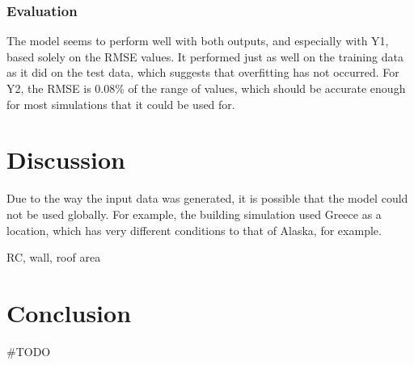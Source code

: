 \documentclass[12pt]{article}
\begin{document}
\section{Evaluation}

The model seems to perform well with both outputs, and especially with Y1, based solely on the RMSE values. It performed just as well on the training data as it did on the test data, which suggests that overfitting has not occurred. For Y2, the RMSE is 0.08\% of the range of values, which should be accurate enough for most simulations that it could be used for. 

\part{Discussion}

Due to the way the input data was generated, it is possible that the model could not be used globally. For example, the building simulation used Greece as a location, which has very different conditions to that of Alaska, for example. 

RC, wall, roof area

\part{Conclusion}

\#TODO



\end{document}
